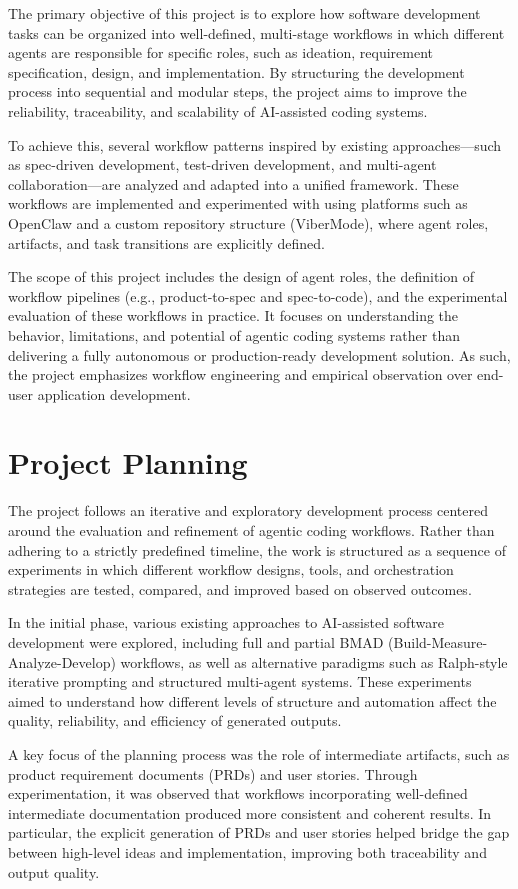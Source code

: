 \documentclass[a4paper,12pt]{report}
\begin{document}
The primary objective of this project is to explore how software development tasks can be organized into well-defined, multi-stage workflows in which different agents are responsible for specific roles, such as ideation, requirement specification, design, and implementation. By structuring the development process into sequential and modular steps, the project aims to improve the reliability, traceability, and scalability of AI-assisted coding systems.

To achieve this, several workflow patterns inspired by existing approaches---such as spec-driven development, test-driven development, and multi-agent collaboration---are analyzed and adapted into a unified framework. These workflows are implemented and experimented with using platforms such as OpenClaw and a custom repository structure (ViberMode), where agent roles, artifacts, and task transitions are explicitly defined.

The scope of this project includes the design of agent roles, the definition of workflow pipelines (e.g., product-to-spec and spec-to-code), and the experimental evaluation of these workflows in practice. It focuses on understanding the behavior, limitations, and potential of agentic coding systems rather than delivering a fully autonomous or production-ready development solution. As such, the project emphasizes workflow engineering and empirical observation over end-user application development.
\section{Project Planning}
The project follows an iterative and exploratory development process centered around the evaluation and refinement of agentic coding workflows. Rather than adhering to a strictly predefined timeline, the work is structured as a sequence of experiments in which different workflow designs, tools, and orchestration strategies are tested, compared, and improved based on observed outcomes.

In the initial phase, various existing approaches to AI-assisted software development were explored, including full and partial BMAD (Build-Measure-Analyze-Develop) workflows, as well as alternative paradigms such as Ralph-style iterative prompting and structured multi-agent systems. These experiments aimed to understand how different levels of structure and automation affect the quality, reliability, and efficiency of generated outputs.

A key focus of the planning process was the role of intermediate artifacts, such as product requirement documents (PRDs) and user stories. Through experimentation, it was observed that workflows incorporating well-defined intermediate documentation produced more consistent and coherent results. In particular, the explicit generation of PRDs and user stories helped bridge the gap between high-level ideas and implementation, improving both traceability and output quality.
\end{document}
